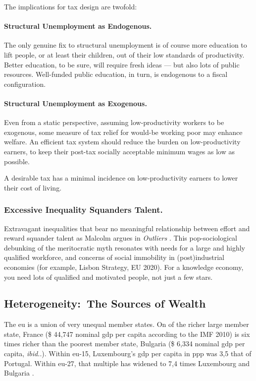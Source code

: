 The implications for tax design are twofold:

\paragraph{Structural Unemployment as Endogenous.}
The only genuine fix to structural unemployment is of course more education to lift people, or at least their children, out of their low standards of productivity.
Better education, to be sure, will require fresh ideas --- but also lots of public resources.
Well-funded public education, in turn, is endogenous to a fiscal configuration.

\paragraph{Structural Unemployment as Exogenous.}
Even from a static perspective, assuming low-productivity workers to be exogenous, some measure of tax relief for would-be working poor may enhance welfare.
An efficient tax system should reduce the burden on low-productivity earners, to keep their post-tax socially acceptable minimum wages as low as possible.
\newpage
\begin{desideratum}
	\label{des:low-price-floor}
	A desirable tax has a minimal incidence on low-productivity earners to lower their cost of living.
\end{desideratum}

\subsubsection{Excessive Inequality Squanders Talent.}
Extravagant inequalities that bear no meaningful relationship between effort and reward squander talent as Malcolm \citeauthor{Gladwell} argues in \emph{Outliers} \citeyearpar{Gladwell}.
This pop-sociological debunking of the meritocratic myth resonates with needs
for a large and highly qualified workforce, and concerns of social immobility in (post)industrial economies (for example, Lisbon Strategy, EU 2020).
For a knowledge economy, you need lots of qualified and motivated people, not just a few stars.

\subsection[Heterogeneity]{Heterogeneity:\ The Sources of Wealth}
	\label{sec:sources-of-wealth}
The \gls{eu} is a union of very unequal member states.
On of the richer large member state, France (\$ 44,747 nominal \gls{gdp} per capita according to the IMF 2010) is six times richer than the poorest member state, Bulgaria (\$ 6,334 nominal \gls{gdp} per capita, \emph{ibid.}.).
Within \gls{eu}-15, Luxembourg's \gls{gdp} per capita in \gls{ppp} was 3,5 that of Portugal.
Within \gls{eu}-27, that multiple has widened to 7,4 times Luxembourg and Bulgaria \citep[1]{Alber2008}.

